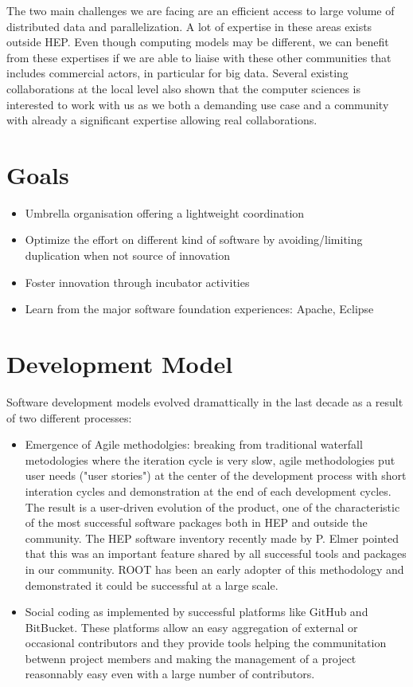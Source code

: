 \documentclass[11pt]{article} %
\begin{document}
The two main challenges we are facing are an efficient access to large
volume of distributed data and parallelization. A lot of expertise in
these areas exists outside HEP. Even though computing models may be
different, we can benefit from these expertises if we are able to
liaise with these other communities that includes commercial actors,
in particular for big data. Several existing collaborations at the
local level also shown that the computer sciences is interested to
work with us as we both a demanding use case and a community with
already a significant expertise allowing real collaborations.

\section{Goals}

\begin{itemize}
 \item Umbrella organisation offering a lightweight coordination
 \item Optimize the effort on different kind of software by
   avoiding/limiting duplication when not source of innovation
 \item Foster innovation through incubator activities
 \item Learn from the major software foundation experiences: Apache, Eclipse
\end{itemize}

\section{Development Model}

Software development models evolved dramattically in the last decade as a result of two different processes:

\begin{itemize}
\item Emergence of Agile methodolgies: breaking from traditional
  waterfall metodologies where the iteration cycle is very slow, agile
  methodologies put user needs ("user stories") at the center of the
  development process with short interation cycles and demonstration
  at the end of each development cycles. The result is a user-driven
  evolution of the product, one of the characteristic of the most
  successful software packages both in HEP and outside the
  community. The HEP software inventory recently made by P. Elmer
  pointed that this was an important feature shared by all successful
  tools and packages in our community. ROOT has been an early adopter
  of this methodology and demonstrated it could be successful at a
  large scale.

\item Social coding as implemented by successful platforms like GitHub
  and BitBucket. These platforms allow an easy aggregation of external
  or occasional contributors and they provide tools helping the
  communitation betwenn project members and making the management of a
  project reasonnably easy even with a large number of contributors.

\end{itemize}
\end{document}
